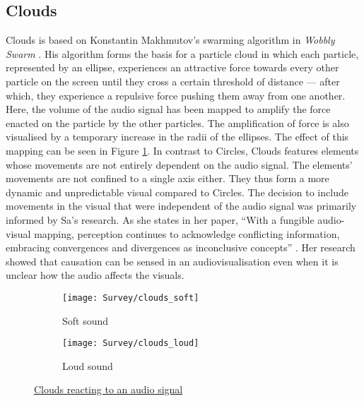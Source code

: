 \documentclass[../initial_thesis.tex]{subfiles}
\begin{document}
\subsection{Clouds}
Clouds is based on Konstantin Makhmutov's swarming algorithm in \textit{Wobbly Swarm} \cite{Makhmutov}. His algorithm forms the basis for a particle cloud in which each particle, represented by an ellipse, experiences an attractive force towards every other particle on the screen until they cross a certain threshold of distance --- after which, they experience a repulsive force pushing them away from one another. Here, the volume of the audio signal has been mapped to amplify the force enacted on the particle by the other particles. The amplification of force is also visualised by a temporary increase in the radii of the ellipses. The effect of this mapping can be seen in Figure \ref{fig:clouds1}. In contrast to Circles, Clouds features elements whose movements are not entirely dependent on the audio signal. The elements' movements are not confined to a single axis either. They thus form a more dynamic and unpredictable visual compared to Circles. The decision to include movements in the visual that were independent of the audio signal was primarily informed by Sa's research. As she states in her paper, ``With a fungible audio-visual mapping, perception continues to acknowledge conflicting information, embracing convergences and divergences as inconclusive concepts'' \cite{Sa2014}. Her research showed that causation can be sensed in an audiovisualisation even when it is unclear how the audio affects the visuals. 

\begin{figure}
  \begin{subfigure}{0.5\textwidth}
    \texttt{[image: Survey/clouds\_soft]}
    \caption{Soft sound}
  \end{subfigure} 
  \begin{subfigure}{0.5\textwidth}
    \texttt{[image: Survey/clouds\_loud]}
    \caption{Loud sound}
  \end{subfigure}
  \caption{\href{https://vimeo.com/326766069}{Clouds reacting to an audio signal}}
  \label{fig:clouds1}
\end{figure}
\end{document}
